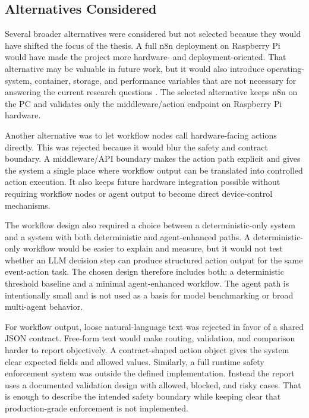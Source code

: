 \subsection{Alternatives Considered}\label{subsec:alternatives-considered}

Several broader alternatives were considered but not selected because they would have shifted the focus of the thesis. A full n8n deployment on Raspberry Pi would have made the project more hardware- and deployment-oriented. That alternative may be valuable in future work, but it would also introduce operating-system, container, storage, and performance variables that are not necessary for answering the current research questions \cite{containerVirtualizationMorabito2017}. The selected alternative keeps n8n on the PC and validates only the middleware/action endpoint on Raspberry Pi hardware.

Another alternative was to let workflow nodes call hardware-facing actions directly. This was rejected because it would blur the safety and contract boundary. A middleware/API boundary makes the action path explicit and gives the system a single place where workflow output can be translated into controlled action execution. It also keeps future hardware integration possible without requiring workflow nodes or agent output to become direct device-control mechanisms.

The workflow design also required a choice between a deterministic-only system and a system with both deterministic and agent-enhanced paths. A deterministic-only workflow would be easier to explain and measure, but it would not test whether an LLM decision step can produce structured action output for the same event-action task. The chosen design therefore includes both: a deterministic threshold baseline and a minimal agent-enhanced workflow. The agent path is intentionally small and is not used as a basis for model benchmarking or broad multi-agent behavior.

For workflow output, loose natural-language text was rejected in favor of a shared JSON contract. Free-form text would make routing, validation, and comparison harder to report objectively. A contract-shaped action object gives the system clear expected fields and allowed values. Similarly, a full runtime safety enforcement system was outside the defined implementation. Instead the report uses a documented validation design with allowed, blocked, and risky cases. That is enough to describe the intended safety boundary while keeping clear that production-grade enforcement is not implemented.

